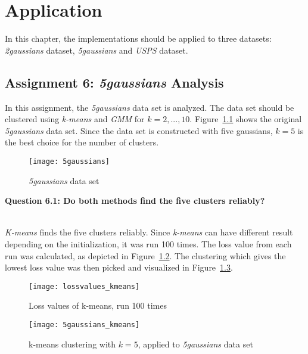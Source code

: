 \chapter{Application}
\label{chap:application}

In this chapter, the implementations should be applied to three datasets: \textit{2gaussians} dataset, \textit{5gaussians} and \textit{USPS} dataset.

\section{Assignment 6: \textit{5gaussians} Analysis}
\label{assignment6}

In this assignment, the \textit{5gaussians} data set is analyzed. The data set should be clustered using \textit{k-means} and \textit{GMM} for $k = 2, ..., 10$. Figure~\ref{fig:5gaussians} shows the original \textit{5gaussians} data set. Since the data set is constructed with five gaussians, $k=5$ is the best choice for the number of clusters. \\

\begin{figure}[h!]
	\centering
	\texttt{[image: 5gaussians]}
	\caption{\textit{5gaussians} data set}
	\label{fig:5gaussians}
\end{figure}

{\raggedright \textbf{Question 6.1: Do both methods find the five clusters reliably?}} \\

\textit{K-means} finds the five clusters reliably. Since \textit{k-means} can have different result depending on the initialization, it was run 100 times. The loss value from each run was calculated, as depicted in Figure~\ref{fig:lossvalues_kmeans}. The clustering which gives the lowest loss value was then picked and visualized in Figure~\ref{fig:5gaussians_kmeans}.

\begin{figure}[h!]
	\centering
	\texttt{[image: lossvalues\_kmeans]}
	\caption{Loss values of k-means, run 100 times}
	\label{fig:lossvalues_kmeans}
\end{figure}

\begin{figure}[h!]
	\centering
	\texttt{[image: 5gaussians\_kmeans]}
	\caption{k-means clustering with $k=5$, applied to \textit{5gaussians} data set}
	\label{fig:5gaussians_kmeans}
\end{figure}

